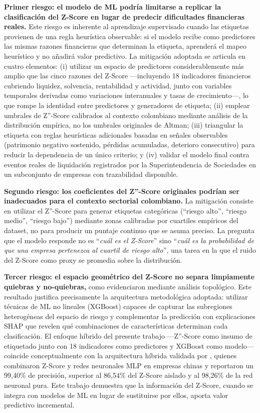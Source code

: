 \documentclass[12pt, letterpaper]{article}
\begin{document}
\textbf{Primer riesgo: el modelo de ML podr\'ia limitarse a replicar la clasificaci\'on del Z-Score en lugar de predecir dificultades financieras reales.} Este riesgo es inherente al aprendizaje supervisado cuando las etiquetas provienen de una regla heur\'istica observable: si el modelo recibe como predictores las mismas razones financieras que determinan la etiqueta, aprender\'a el mapeo heur\'istico y no a\~nadir\'a valor predictivo. La mitigaci\'on adoptada se articula en cuatro elementos: (i) utilizar un espacio de predictores considerablemente m\'as amplio que las cinco razones del Z-Score ---incluyendo 18 indicadores financieros cubriendo liquidez, solvencia, rentabilidad y actividad, junto con variables temporales derivadas como variaciones interanuales y tasas de crecimiento---, lo que rompe la identidad entre predictores y generadores de etiqueta; (ii) emplear umbrales de Z''-Score calibrados al contexto colombiano mediante an\'alisis de la distribuci\'on emp\'irica, no los umbrales originales de Altman; (iii) triangular la etiqueta con reglas heur\'isticas adicionales basadas en se\~nales observables (patrimonio negativo sostenido, p\'erdidas acumuladas, deterioro consecutivo) para reducir la dependencia de un \'unico criterio; y (iv) validar el modelo final contra eventos reales de liquidaci\'on registrados por la Superintendencia de Sociedades en un subconjunto de empresas con trazabilidad disponible.

\textbf{Segundo riesgo: los coeficientes del Z''-Score originales podr\'ian ser inadecuados para el contexto sectorial colombiano.} La mitigaci\'on consiste en utilizar el Z''-Score para generar etiquetas categ\'oricas (``riesgo alto'', ``riesgo medio'', ``riesgo bajo'') mediante zonas calibradas por cuartiles emp\'iricos del dataset, no para producir un puntaje continuo que se asuma preciso. La pregunta que el modelo responde no es ``\textit{cu\'al es el Z-Score}'' sino ``\textit{cu\'al es la probabilidad de que una empresa pertenezca al cuartil de riesgo alto}'', una tarea en la que el ruido del Z-Score como proxy se promedia sobre la distribuci\'on.

\textbf{Tercer riesgo: el espacio geom\'etrico del Z-Score no separa limpiamente quiebras y no-quiebras,} como evidenciaron \citet{Qiu2020} mediante an\'alisis topol\'ogico. Este resultado justifica precisamente la arquitectura metodol\'ogica adoptada: utilizar t\'ecnicas de ML no lineales (XGBoost) capaces de capturar las subregiones heterog\'eneas del espacio de riesgo y complementar la predicci\'on con explicaciones SHAP que revelen qu\'e combinaciones de caracter\'isticas determinan cada clasificaci\'on. El enfoque h\'ibrido del presente trabajo ---Z''-Score como insumo de etiquetado junto con 18 indicadores como predictores y XGBoost como modelo--- coincide conceptualmente con la arquitectura h\'ibrida validada por \citet{Wu2022}, quienes combinaron Z-Score y redes neuronales MLP en empresas chinas y reportaron un 99,40\% de precisi\'on, superior al 86,54\% del Z-Score aislado y al 98,26\% de la red neuronal pura. Este trabajo demuestra que la informaci\'on del Z-Score, cuando se integra con modelos de ML en lugar de sustituirse por ellos, aporta valor predictivo incremental.
\end{document}

